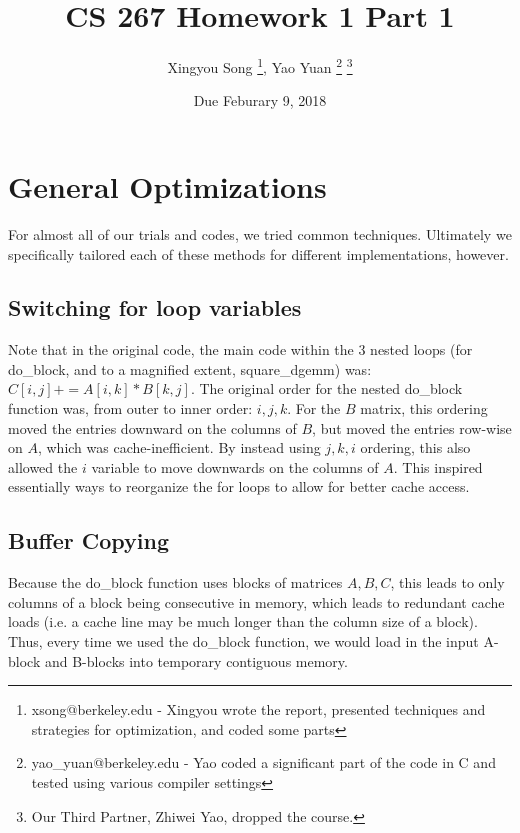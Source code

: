 \documentclass[12pt]{article}
\begin{document}
 
 
 
\title{CS 267 Homework 1 Part 1}
\author{Xingyou Song \footnote{xsong@berkeley.edu - Xingyou wrote the report, presented techniques and strategies for optimization, and coded some parts}, Yao Yuan \footnote{yao\_yuan@berkeley.edu - Yao coded a significant part of the code in C and tested using various compiler settings} \footnote{Our Third Partner, Zhiwei Yao, dropped the course.}} %
\date{Due Feburary 9, 2018} 
\maketitle

\section{General Optimizations}
For almost all of our trials and codes, we tried common techniques. Ultimately we specifically tailored each of these methods for different implementations, however. 

\subsection{Switching for loop variables}
Note that in the original code, the main code within the 3 nested loops (for do\_block, and to a magnified extent, square\_dgemm) was: $C[i,j] += A[i,k] * B[k,j]$. The original order for the nested do\_block function was, from outer to inner order: $i,j,k$. For the $B$ matrix, this ordering moved the entries downward on the columns of $B$, but moved the entries row-wise on $A$, which was cache-inefficient. By instead using $j,k,i$ ordering, this also allowed the $i$ variable to move downwards on the columns of $A$. This inspired essentially ways to reorganize the for loops to allow for better cache access. 

\subsection{Buffer Copying} 
Because the do\_block function uses blocks of matrices $A,B,C$, this leads to only columns of a block being consecutive in memory, which leads to redundant cache loads (i.e. a cache line may be much longer than the column size of a block). Thus, every time we used the do\_block function, we would load in the input A-block and B-blocks into temporary contiguous memory.  
\end{document}
